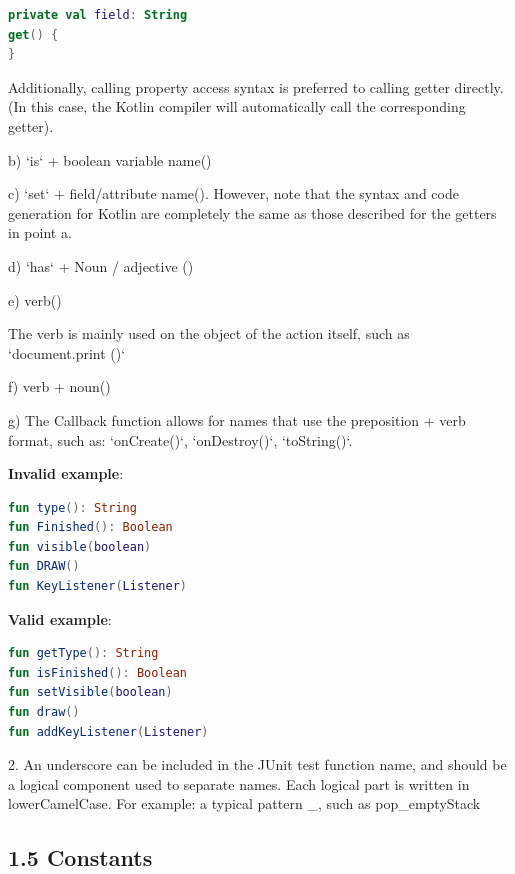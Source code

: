 \begin{lstlisting}[language=Kotlin]
private val field: String
get() {
}
\end{lstlisting}
Additionally, calling property access syntax is preferred to calling getter directly. (In this case, the Kotlin compiler will automatically call the corresponding getter).



b) `is` + boolean variable name()



c) `set` + field/attribute name(). However, note that the syntax and code generation for Kotlin are completely the same as those described for the getters in point a.



d) `has` + Noun / adjective ()



e) verb()

The verb is mainly used on the object of the action itself, such as `document.print ()`



f) verb + noun() 



g) The Callback function allows for names that use the preposition + verb format, such as: `onCreate()`, `onDestroy()`, `toString()`.



\textbf{Invalid example}: 



\begin{lstlisting}[language=Kotlin]
fun type(): String
fun Finished(): Boolean
fun visible(boolean)
fun DRAW()
fun KeyListener(Listener)
\end{lstlisting}


\textbf{Valid example}: 



\begin{lstlisting}[language=Kotlin]
fun getType(): String
fun isFinished(): Boolean
fun setVisible(boolean)
fun draw()
fun addKeyListener(Listener)
\end{lstlisting}


2.	An underscore can be included in the JUnit test function name, and should be a logical component used to separate names. Each logical part is written in lowerCamelCase. For example: a typical pattern \_, such as pop\_emptyStack



\subsection*{\textbf{1.5 Constants}}

